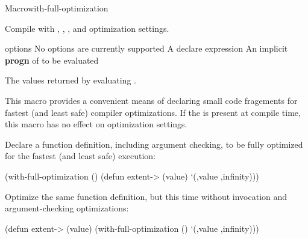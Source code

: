 \documentclass[10pt,twoside,english,pdftex]{article}
\begin{document}
\begin{functiondoc}{Macro}{with-full-optimization}%
  {\code{(}\superstar{}\code{)}
    \superstar{}
    \superstar{} \returns{}
    \superstar}
%
  
\fnsyntax

\fnpurpose Compile  with , , , and  optimization
settings.

\fnpackage {}

\fnmodule {}

\fnargs
\begin{args}{options}
\arg[option] No options are currently supported
\arg[declaration] A declare expression
\arg[forms] An implicit \textbf{progn} of  to be evaluated
\end{args}

\fnreturns The values returned by evaluating .

\fndescription
{}%
This macro provides a convenient means of declaring small code fragements for
fastest (and least safe) compiler optimizations.  If the 
\textbf{} is present at compile time, this macro
has no effect on optimization settings.

\fnexamples Declare a function definition, including argument checking,
to be fully optimized for the fastest (and least safe) execution:

\begin{example}
  (with-full-optimization ()
    (defun extent-> (value)
      `(,value ,infinity)))
\end{example}

Optimize the same function definition, but this time without invocation and
argument-checking optimizations:

\begin{example}
  (defun extent-> (value)
    (with-full-optimization ()
      `(,value ,infinity)))
\end{example}

\end{functiondoc}

\end{document}
